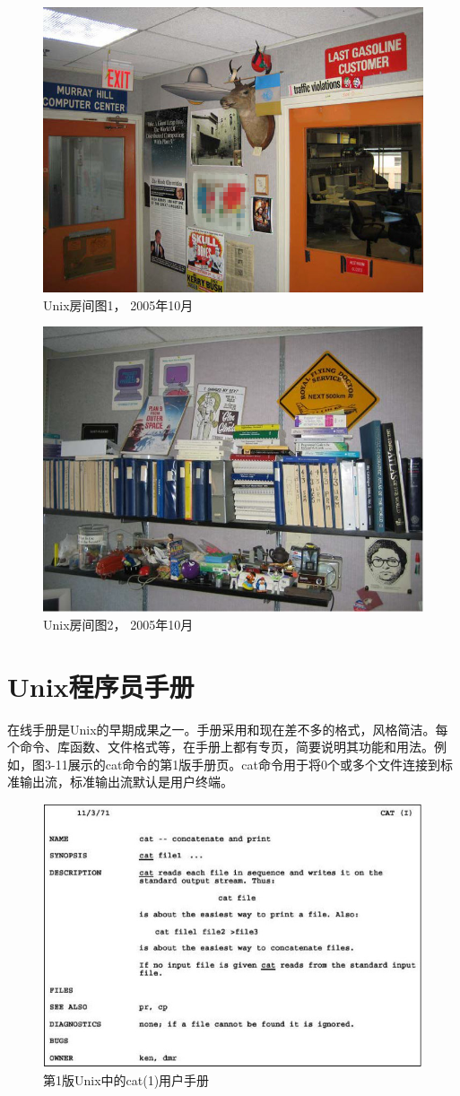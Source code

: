 \documentclass[a4paper,12pt,UTF8,twoside]{ctexbook}
\begin{document}
\begin{figure}[htbp]
	\centering
	\includegraphics[width=0.7\linewidth]{27}
	\caption{Unix房间图1， 2005年10月}
	\label{fig:1}
\end{figure}

\begin{figure}[htbp]
	\centering
	\includegraphics[width=0.7\linewidth]{28}
	\caption{Unix房间图2， 2005年10月}
	\label{fig:1}
\end{figure}

\section{Unix程序员手册}

在线手册是Unix的早期成果之一。手册采用和现在差不多的格式，风格简洁。每个命令、库函数、文件格式等，在手册上都有专页，简要说明其功能和用法。例如，图3-11展示的cat命令的第1版手册页。cat命令用于将0个或多个文件连接到标准输出流，标准输出流默认是用户终端。

\begin{figure}[htbp]
	\centering
	\includegraphics[width=0.7\linewidth]{29}
	\caption{第1版Unix中的cat(1)用户手册}
	\label{fig:1}
\end{figure}
\end{document}
